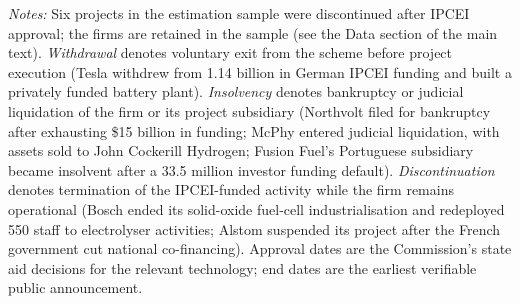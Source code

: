 \begin{table}[!ht]
\begin{threeparttable}
\begin{tablenotes}[flushleft]
\item \textit{Notes:} Six projects in the estimation sample were discontinued after IPCEI approval; the firms are retained in the sample (see the Data section of the main text). \textit{Withdrawal} denotes voluntary exit from the scheme before project execution (Tesla withdrew from \texteuro{}1.14 billion in German IPCEI funding and built a privately funded battery plant). \textit{Insolvency} denotes bankruptcy or judicial liquidation of the firm or its project subsidiary (Northvolt filed for bankruptcy after exhausting \$15 billion in funding; McPhy entered judicial liquidation, with assets sold to John Cockerill Hydrogen; Fusion Fuel's Portuguese subsidiary became insolvent after a \texteuro{}33.5 million investor funding default). \textit{Discontinuation} denotes termination of the IPCEI-funded activity while the firm remains operational (Bosch ended its solid-oxide fuel-cell industrialisation and redeployed 550 staff to electrolyser activities; Alstom suspended its project after the French government cut national co-financing). Approval dates are the Commission's state aid decisions for the relevant technology; end dates are the earliest verifiable public announcement.
\end{tablenotes}
\end{threeparttable}
\end{table}
